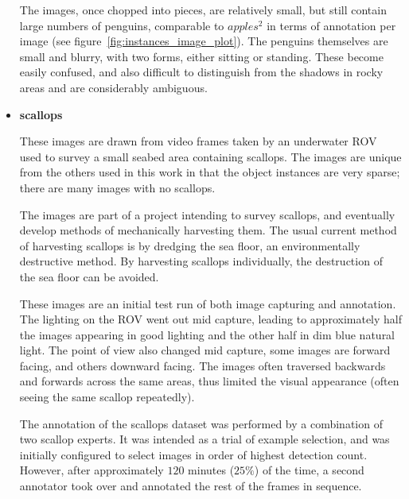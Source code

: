 \begin{itemize}
The images, once chopped into pieces, are relatively small, but still contain large numbers of penguins, comparable to $apples^2$ in terms of annotation per image (see figure~\ref{fig:instances_image_plot}). The penguins themselves are small and blurry, with two forms, either sitting or standing. These become  easily confused, and also difficult to distinguish from the shadows in rocky areas and are considerably ambiguous. 
    \item{\bf{scallops}}
    
These images are drawn from video frames taken by an underwater \gls{ROV} used to survey a small seabed area containing scallops. The images are unique from the others used in this work in that the object instances are very sparse; there are many images with no scallops. 

The images are part of a project intending to survey scallops, and eventually develop methods of mechanically harvesting them. The usual current method of harvesting scallops is by dredging the sea floor, an environmentally destructive method. By harvesting scallops individually, the destruction of the sea floor can be avoided.

These images are an initial test run of both image capturing and annotation. The lighting on the \gls{ROV} went out mid capture, leading to approximately half the images appearing in good lighting and the other half in dim blue natural light. The point of view also changed mid capture, some images are forward facing, and others downward facing. The images often traversed backwards and forwards across the same areas, thus limited the visual appearance (often seeing the same scallop repeatedly). 

The annotation of the scallops dataset was performed by a combination of two scallop experts. It was intended as a trial of example selection, and was initially configured to select images in order of highest detection count. However, after approximately $120$ minutes ($25\%$) of the time, a second annotator took over and annotated the rest of the frames in sequence.

\end{itemize}


